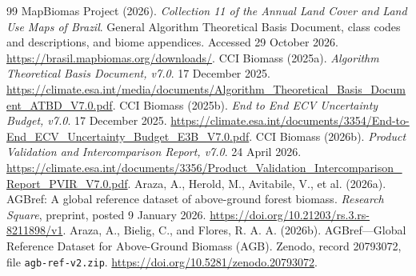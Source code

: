 \documentclass[11pt,a4paper]{article}
\begin{document}
\begin{thebibliography}{99}
 MapBiomas Project (2026). \emph{Collection 11 of the Annual Land Cover and Land Use Maps of Brazil}. General Algorithm Theoretical Basis Document, class codes and descriptions, and biome appendices. Accessed 29 October 2026. \url{https://brasil.mapbiomas.org/downloads/}.
 CCI Biomass (2025a). \emph{Algorithm Theoretical Basis Document, v7.0}. 17 December 2025. \url{https://climate.esa.int/media/documents/Algorithm_Theoretical_Basis_Document_ATBD_V7.0.pdf}.
 CCI Biomass (2025b). \emph{End to End ECV Uncertainty Budget, v7.0}. 17 December 2025. \url{https://climate.esa.int/documents/3354/End-to-End_ECV_Uncertainty_Budget_E3B_V7.0.pdf}.
 CCI Biomass (2026b). \emph{Product Validation and Intercomparison Report, v7.0}. 24 April 2026. \url{https://climate.esa.int/documents/3356/Product_Validation_Intercomparison_Report_PVIR_V7.0.pdf}.
 Araza, A., Herold, M., Avitabile, V., et al. (2026a). AGBref: A global reference dataset of above-ground forest biomass. \emph{Research Square}, preprint, posted 9 January 2026. \url{https://doi.org/10.21203/rs.3.rs-8211898/v1}.
 Araza, A., Bielig, C., and Flores, R. A. A. (2026b). AGBref---Global Reference Dataset for Above-Ground Biomass (AGB). Zenodo, record 20793072, file \texttt{agb-ref-v2.zip}. \url{https://doi.org/10.5281/zenodo.20793072}.
\end{thebibliography}
\end{document}
